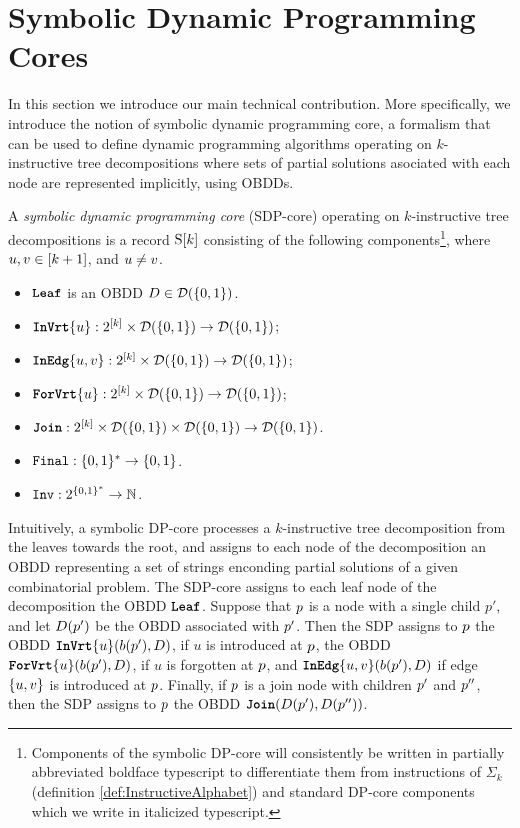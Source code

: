 \section{Symbolic Dynamic Programming Cores}
\label{SymbolicDPCores}

In this section we introduce our main technical contribution. More specifically, we introduce the notion of symbolic dynamic programming core, a formalism that can be used to define dynamic programming algorithms operating on $k$-instructive tree decompositions where sets of partial solutions asociated with each node are represented implicitly, using OBDDs. 

A {\em symbolic dynamic programming core} (SDP-core) operating on $k$-instructive tree decompositions is a record $\mathrm{S}[k]$ consisting of the following components\footnote{Components of the symbolic DP-core will consistently be written in partially abbreviated boldface typescript to differentiate them from instructions of $\Sigma_k$ (definition \ref{def:InstructiveAlphabet}) and standard DP-core components which we write in italicized typescript.}, where $u,v \in [k+1]$, and 
$u\neq v$. 

\begin{itemize}
    \item $\texttt{\textbf{Leaf}}$ is an OBDD $D\in \mathcal{D}(\{0,1\})$. 
    \item $\texttt{\textbf{InVrt}}\{u\}:2^{[k]}\times  
    \mathcal{D}(\{0,1\})\rightarrow \mathcal{D}(\{0,1\})$;
    \item $\texttt{\textbf{InEdg}}\{u,v\}:2^{[k]}\times\mathcal{D}(\{0,1\})\rightarrow \mathcal{D}(\{0,1\})$;
    \item $\texttt{\textbf{ForVrt}}\{u\}:2^{[k]}\times \mathcal{D}(\{0,1\})\rightarrow \mathcal{D}(\{0,1\})$;
    \item $\texttt{\textbf{Join}}:2^{[k]}\times \mathcal{D}(\{0,1\})\times 
    \mathcal{D}(\{0,1\})
    \rightarrow 
    \mathcal{D}(\{0,1\})$.
    \item $\texttt{Final}:\{0,1\}^*\rightarrow \{0,1\}$. 
    \item $\texttt{Inv}:2^{\{0,1\}^*}\rightarrow \mathbb{N}$. 
\end{itemize}


Intuitively, a symbolic DP-core processes a $k$-instructive tree decomposition from the leaves towards the root, and assigns to each node of the decomposition an OBDD representing a set of strings enconding partial solutions of a given combinatorial problem. The SDP-core assigns to each leaf node of the decomposition the OBDD $\texttt{\textbf{Leaf}}$. Suppose that $p$ is a node with a single child $p'$, and let $D(p')$ be the OBDD associated with $p'$. Then the SDP assigns to $p$ the OBDD 
$\texttt{\textbf{InVrt}}\{u\}(b(p'),D)$, if $u$ is introduced at $p$, the OBDD 
$\texttt{\textbf{ForVrt}}\{u\}(b(p'),D)$, if $u$ is forgotten at $p$, and 
$\texttt{\textbf{InEdg}}\{u,v\}(b(p'),D)$ if edge $\{u,v\}$ is introduced at $p$. Finally, if $p$ is a join node with children $p'$ and $p''$, then the SDP assigns to $p$ the OBDD 
$\texttt{\textbf{Join}}(D(p'),D(p''))$. 

